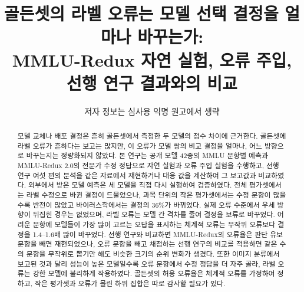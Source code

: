 \documentclass[11pt]{article}
\title{골든셋의 라벨 오류는 모델 선택 결정을 얼마나 바꾸는가:\\
MMLU-Redux 자연 실험, 오류 주입, 선행 연구 결과와의 비교}
\author{저자 정보는 심사용 익명 원고에서 생략}
\begin{document}
\maketitle

\begin{abstract}
모델 교체나 배포 결정은 흔히 골든셋에서 측정한 두 모델의 점수 차이에 근거한다. 골든셋에 라벨 오류가 흔하다는 보고는 많지만, 이 오류가 모델 쌍의 비교 결정을 얼마나, 어느 방향으로 바꾸는지는 정량화되지 않았다. 본 연구는 공개 모델 42종의 MMLU 문항별 예측과 MMLU-Redux 2.0의 전문가 수정 정답으로 자연 실험과 오류 주입 실험을 수행하고, 선행 연구 여섯 편의 분석을 같은 자료에서 재현하거나 대응 값을 계산하여 그 보고값과 비교하였다. 외부에서 받은 모델 예측은 세 모델을 직접 다시 실행하여 검증하였다. 전체 평가셋에서는 라벨 수정으로 바뀐 결정이 드물었으나, 과목 단위의 작은 평가셋에서는 수정 문항이 많을수록 반전이 많았고 바이러스학에서는 결정의 36\%가 바뀌었다. 실제 오류 수준에서 우세 방향이 뒤집힌 경우는 없었으며, 라벨 오류는 모델 간 격차를 줄여 결정을 보류로 바꾸었다. 어려운 문항에 모델들이 가장 많이 고르는 오답을 표시하는 체계적 오류는 무작위 오류보다 결정을 1.4--1.6배 많이 바꾸었다. 선행 연구와 비교하면 MMLU-Redux의 오류율은 판단 유보 문항을 빼면 재현되었으나, 오류 문항을 빼고 채점하는 선행 연구의 비교를 적용하면 같은 수의 문항을 무작위로 뽑기만 해도 비슷한 크기의 순위 변화가 생겼다. 또한 이미지 분류에서 보고된 것과 달리 성능이 높은 모델일수록 오류 문항에서 수정 정답을 더 자주 골라, 라벨 오류는 강한 모델에 불리하게 작용하였다. 골든셋의 허용 오류율은 체계적 오류를 가정하여 정하고, 작은 평가셋과 오류가 몰린 하위 집합은 따로 감사할 필요가 있다.
\end{abstract}
\end{document}
